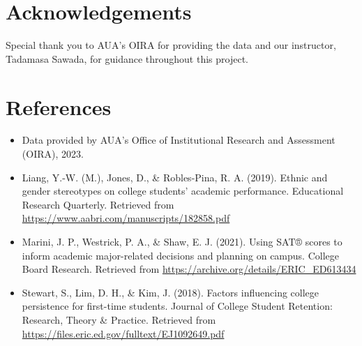 \documentclass[
  12pt,
]{article}
\begin{document}
\section{Acknowledgements}\label{acknowledgements}

Special thank you to AUA's OIRA for providing the data and our
instructor, Tadamasa Sawada, for guidance throughout this project.

\section{References}\label{references}

\begin{itemize}
\item
  Data provided by AUA's Office of Institutional Research and Assessment
  (OIRA), 2023.
\item
  Liang, Y.-W. (M.), Jones, D., \& Robles-Pina, R. A. (2019). Ethnic and
  gender stereotypes on college students' academic performance.
  Educational Research Quarterly. Retrieved from
  \url{https://www.aabri.com/manuscripts/182858.pdf}
\item
  Marini, J. P., Westrick, P. A., \& Shaw, E. J. (2021). Using SAT®
  scores to inform academic major-related decisions and planning on
  campus. College Board Research. Retrieved from
  \url{https://archive.org/details/ERIC_ED613434}
\item
  Stewart, S., Lim, D. H., \& Kim, J. (2018). Factors influencing
  college persistence for first-time students. Journal of College
  Student Retention: Research, Theory \& Practice. Retrieved from
  \url{https://files.eric.ed.gov/fulltext/EJ1092649.pdf}
\end{itemize}
\end{document}
